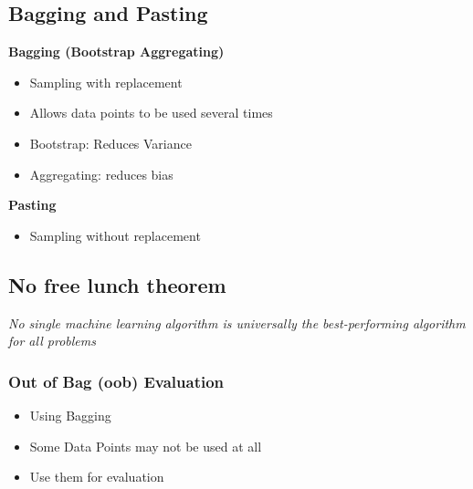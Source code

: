 \subsection{Bagging and Pasting}
\textbf{Bagging (Bootstrap Aggregating)}
\begin{itemize}
    \item Sampling with replacement
    \item Allows data points to be used several times
    \item Bootstrap: Reduces Variance
    \item Aggregating: reduces bias
\end{itemize}
\textbf{Pasting}
\begin{itemize}
    \item Sampling without replacement
\end{itemize}

\subsection{No free lunch theorem}
\textit{No single machine learning algorithm is universally the best-performing algorithm for all problems}

\subsubsection{Out of Bag (oob) Evaluation}
\begin{itemize}
    \item Using Bagging
    \item Some Data Points may not be used at all
    \item Use them for evaluation 
\end{itemize}